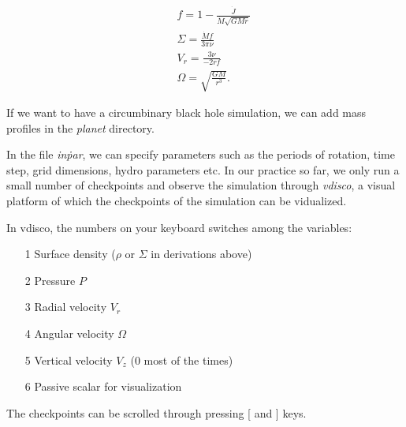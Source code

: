 \documentclass{article}
\begin{document}
\begin{eqnarray}
    && f = 1 - \frac{\dot J}{ \dot M \sqrt{GMr}} \nonumber \\
    && \Sigma = \frac{\dot M f }{ 3 \pi \nu} \nonumber \\
    && V_r = \frac{3\nu}{-2rf} \nonumber \\
    && \Omega = \sqrt{\frac{GM}{r^3}}.
\end{eqnarray}



If we want to have a circumbinary black hole simulation, we can add mass profiles in the \emph{planet} directory. 



In the file \emph{in\.par}, we can specify parameters such as the periods of rotation, time step, grid dimensions, hydro parameters etc.
In our practice so far, we only run a small number of checkpoints and observe the simulation through \emph{vdisco}, a visual
platform of which the checkpoints of the simulation can be vidualized. 

In vdisco, the numbers on your keyboard switches among the variables:
\begin{enumerate}
    \item [1] Surface density ($\rho$ or $\Sigma$ in derivations above)
    \item [2] Pressure $P$
    \item [3] Radial velocity $V_r$
    \item [4] Angular velocity $\Omega$
    \item [5] Vertical velocity $V_z$ ($0$ most of the times)
    \item [6] Passive scalar for visualization 
\end{enumerate}

The checkpoints can be scrolled through pressing [ and ] keys. 
\end{document}
